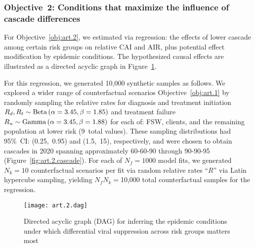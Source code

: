 \subsubsection{Objective~2: Conditions that maximize the influence of cascade differences}\label{art.meth.obj.2}
For Objective~\ref{obj:art.2}, we estimated via regression:
the effects of lower cascade among certain risk groups on relative CAI and AIR,
plus potential effect modification by epidemic conditions.
The hypothesized causal effects are illustrated
as a directed acyclic graph in Figure~\ref{fig:art.2.dag}.
\par
For this regression, we generated 10,000 synthetic samples as follows.
We explored a wider range of counterfactual scenarios \vs Objective~\ref{obj:art.1}
by randomly sampling the relative rates for
diagnosis and treatment initiation $R_d, R_t \sim \textnormal{Beta}\,(\alpha=3.45,\beta=1.85)$
and treatment failure $R_u \sim \textnormal{Gamma}\,(\alpha=3.45,\beta=1.88)$
for each of: FSW, clients, and the remaining population at lower risk (9~total values).
These sampling distributions had 95\%~CI: (0.25,~0.95) and (1.5,~15), respectively,
and were chosen to obtain cascades in 2020 spanning
approximately \mbox{60-60-90} through \mbox{90-90-95} (Figure~\ref{fig:art.2.cascade}). %
For each of $N_f = 1000$ model fits, we generated $N_k = 10$ counterfactual scenarios per fit
via random relative rates ``$R$'' via Latin hypercube sampling,
yielding $N_f N_k = {}$10,000 total counterfactual samples for the regression.
\begin{figure}
  \centering\texttt{[image: art.2.dag]}
  \caption{Directed acyclic graph (DAG) for inferring
    the epidemic conditions under which
    differential viral suppression across risk groups matters most}
  \label{fig:art.2.dag}
\end{figure}
